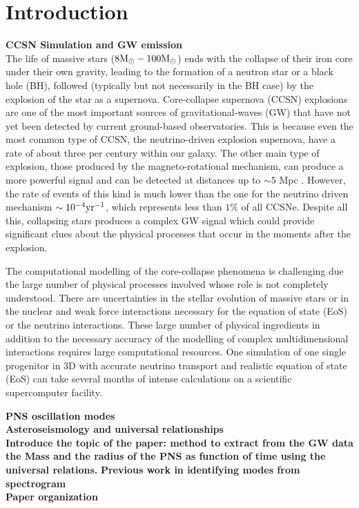 \section{Introduction}


\textbf{CCSN Simulation and GW emission}\\
The life of massive stars ($8 {\rm M}_\odot-100{\rm M}_\odot$) ends with the collapse of their iron core under their own gravity, leading to the formation of a neutron star or a black hole (BH), followed (typically but not necessarily in the BH case)  by the explosion of the star as a supernova. Core-collapse supernova (CCSN) explosions are one of the most important sources of gravitational-waves (GW) that have not yet been detected by current ground-based observatories. This is because even the most common type of CCSN, the neutrino-driven explosion supernova, have a rate of about three per century \cite{Gossan:2016} within our galaxy. The other main type of explosion, those produced by the magneto-rotational mechanism, can produce a more powerful signal and can be detected at distances up to $\sim 5$ Mpc \cite{Gossan:2016}. However, the rate of events of this kind is much lower than the one for the neutrino driven mechanism $\sim 10^{-4} \rm{yr}^{-1}$, which represents less than $1 \%$ of all CCSNe.
Despite all this, collapsing stars produces a complex GW signal which could provide significant clues about the physical processes that occur in the moments after the explosion. 

The computational modelling of the core-collapse phenomena is challenging due the large number of physical processes involved whose role is not completely understood. There are uncertainties in the stellar evolution of massive stars or in the nuclear and weak force interactions necessary for the equation of state (EoS) or the neutrino interactions.  These large number of physical ingredients in addition to the necessary accuracy of the modelling of complex multidimensional interactions requires large computational resources. One simulation of one single progenitor in 3D with accurate neutrino transport and realistic equation of state (EoS) can take several months of intense calculations on a scientific supercomputer facility.

\textbf{PNS oscillation modes}\\
\textbf{Asteroseismology and universal relationships}\\
\textbf{Introduce the topic of the paper: method to extract from the GW data the Mass and the radius of the PNS as function of time using the universal relations.}
\textbf{Previous work in identifying modes from spectrogram}\\
\textbf{Paper organization}\\

